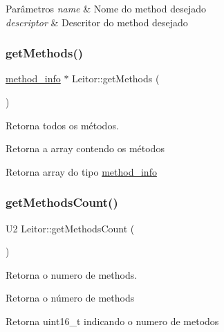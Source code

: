 \begin{DoxyParams}{Parâmetros}
{\em name} & Nome do method desejado \\
\hline
{\em descriptor} & Descritor do method desejado \\
\hline
\end{DoxyParams}
\mbox{\label{classLeitor_aa08c48544276f3c849eb138576d9f1b3}} 
\subsubsection{\texorpdfstring{get\+Methods()}{getMethods()}}
{\footnotesize\ttfamily \hyperlink{structmethod__info}{method\+\_\+info} $\ast$ Leitor\+::get\+Methods (\begin{DoxyParamCaption}{ }\end{DoxyParamCaption})}



Retorna todos os métodos. 

Retorna a array contendo os métodos \begin{DoxyReturn}{Retorna}
array do tipo \hyperlink{structmethod__info}{method\+\_\+info} 
\end{DoxyReturn}
\mbox{\label{classLeitor_a1bf5bcc94ae930802de39077836d6566}} 
\subsubsection{\texorpdfstring{get\+Methods\+Count()}{getMethodsCount()}}
{\footnotesize\ttfamily U2 Leitor\+::get\+Methods\+Count (\begin{DoxyParamCaption}{ }\end{DoxyParamCaption})}



Retorna o numero de methods. 

Retorna o número de methods \begin{DoxyReturn}{Retorna}
uint16\+\_\+t indicando o numero de metodos 
\end{DoxyReturn}
\mbox{\label{classLeitor_a28757ad7042926102520d2f28387acfe}} 
